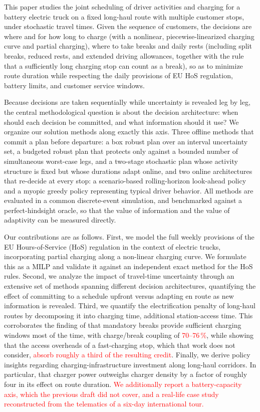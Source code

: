 \documentclass[preprint,12pt,3p]{elsarticle}
\newcommand{\red}[1]{\textcolor{red}{#1}}
\begin{document}
This paper studies the joint scheduling of driver activities and charging for a battery electric truck on a fixed long-haul route with multiple customer stops, under stochastic travel times. Given the sequence of customers, the decisions are where and for how long to charge (with a nonlinear, piecewise-linearized charging curve and partial charging), where to take breaks and daily rests (including split breaks, reduced rests, and extended driving allowances, together with the rule that a sufficiently long charging stop can count as a break), so as to minimize route duration while respecting the daily provisions of EU HoS regulation, battery limits, and customer service windows.


Because decisions are taken sequentially while uncertainty is revealed leg by leg, the central methodological question is about the decision architecture: when should each decision be committed, and what information should it use? We organize our solution methods along exactly this axis. Three offline methods that commit a plan before departure: a box robust plan over an interval uncertainty set, a budgeted robust plan that protects only against a bounded number of simultaneous worst-case legs, and a two-stage stochastic plan whose activity structure is fixed but whose durations adapt online, and two online architectures that re-decide at every stop: a scenario-based rolling-horizon look-ahead policy and a myopic greedy policy representing typical driver behavior. All methods are evaluated in a common discrete-event simulation, and benchmarked against a perfect-hindsight oracle, so that the value of information and the value of adaptivity can be measured directly.


Our contributions are as follows.
First, we model the full weekly provisions of the EU Hours-of-Service (HoS) regulation in the context of electric trucks, incorporating partial charging along a non-linear charging curve. We formulate this as a MILP and validate it against an independent exact method for the HoS rules.
Second, we analyze the impact of travel-time uncertainty through an extensive set of methods spanning different decision architectures, quantifying the effect of committing to a schedule upfront versus adapting en route as new information is revealed.
Third, we quantify the electrification penalty of long-haul routes by decomposing it into charging time, additional station-access time. This corroborates the finding of \citet{brockmann_break-and-charge_2025} that mandatory breaks provide sufficient charging windows most of the time, with charge/break coupling of \red{70--76\,\%}, while showing that the access overheads of a fast-charging stop, which that work does not consider, \red{absorb roughly a third of the resulting credit}.
Finally, we derive policy insights regarding charging-infrastructure investment along long-haul corridors. In particular, that charger power outweighs charger density by a factor of roughly four in its effect on route duration.
\red{We additionally report a battery-capacity axis, which the previous draft did not cover, and a real-life case study reconstructed from the telematics of a six-day international tour.}
\end{document}
